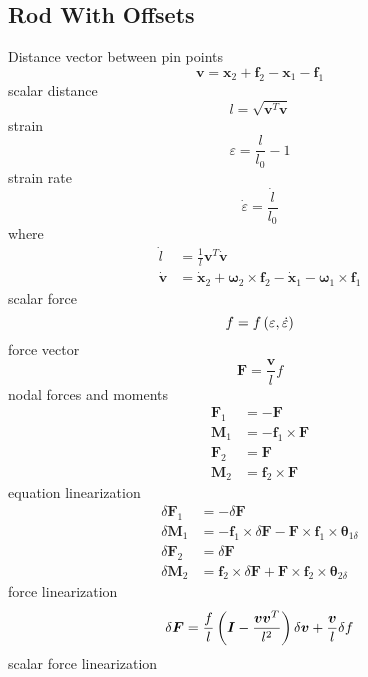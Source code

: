 \documentclass[10pt,dvips,fleqn]{report}
\newcommand{\T}[1]{\boldsymbol{#1}}
\begin{document}
\subsection{Rod With Offsets}
Distance vector between pin points
\begin{equation}
	\T{v} = \T{x}_2 + \T{f}_2 - \T{x}_1 - \T{f}_1
\end{equation}
scalar distance
\begin{equation}
	l = \sqrt{\T{v}^T \T{v}}
\end{equation}
strain
\begin{equation}
	\varepsilon = \frac{l}{l_0} - 1
\end{equation}
strain rate
\begin{equation}
	\dot{\varepsilon} = \frac{\dot{l}}{l_0}
\end{equation}
where
\begin{align}
	\dot{l} &= \frac{1}{l} \T{v}^T \dot{\T{v}} \\
	\dot{\T{v}} &= \dot{\T{x}}_2 + \T{\omega}_2 \times \T{f}_2
		- \dot{\T{x}}_1 - \T{\omega}_1 \times \T{f}_1
\end{align}
scalar force
\begin{equation}
	f = f\left( \varepsilon, \dot{\varepsilon} \right)
\end{equation}
force vector
\begin{equation}
	\T{F} = \frac{\T{v}}{l} f
\end{equation}
nodal forces and moments
\begin{align}
	\T{F}_1 &= -\T{F} \\
	\T{M}_1 &= -\T{f}_1 \times \T{F} \\
	\T{F}_2 &= \T{F} \\
	\T{M}_2 &= \T{f}_2 \times \T{F}
\end{align}
equation linearization
\begin{align}
	\delta\T{F}_1 &= -\delta\T{F} \\
	\delta\T{M}_1 &= -\T{f}_1 \times \delta\T{F} - \T{F}\times\T{f}_1\times \T{\theta}_{1\delta} \\
	\delta\T{F}_2 &= \delta\T{F} \\
	\delta\T{M}_2 &= \T{f}_2 \times \delta\T{F} + \T{F}\times\T{f}_2\times \T{\theta}_{2\delta}
\end{align}
force linearization
\begin{equation}
	\delta\T{F} = \frac{f}{l}\plbr{\T{I} - \frac{\T{v}\T{v}^T}{l^2}} \delta\T{v} + \frac{\T{v}}{l} \delta{f}
\end{equation}
scalar force linearization
\end{document}
